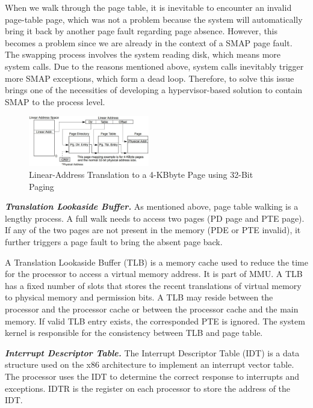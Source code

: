 
When we walk through the page table, it is inevitable to encounter an invalid page-table page, which was not a problem because the system will automatically bring it back by another page fault regarding page absence. However, this becomes a problem since we are already in the context of a SMAP page fault. The swapping process involves the system reading disk, which means more system calls. Due to the reasons mentioned above, system calls inevitably trigger more SMAP exceptions, which form a dead loop. Therefore, to solve this issue brings one of the necessities of developing a hypervisor-based solution to contain SMAP to the process level. 



\begin{figure}[th]
  \includegraphics[width=0.47\textwidth]{figures/pagetable}
  \centering
  \caption{Linear-Address Translation to a 4-KBbyte Page using 32-Bit Paging~\cite{guide2011intel}}
  \label{fig:pagetable}
\end{figure}

\textbf{\textit{Translation Lookaside Buffer.}} As mentioned above, page table walking is a lengthy process. A full walk needs to access two pages (PD page and PTE page). If any of the two pages are not present in the memory (PDE or PTE invalid), it further triggers a page fault to bring the absent page back.

A Translation Lookaside Buffer (TLB) is a memory cache used to reduce the time for the processor to access a virtual memory address. It is part of MMU. A TLB has a fixed number of slots that stores the recent translations of virtual memory to physical memory and permission bits.  A TLB may reside between the processor and the processor cache or between the processor cache and the main memory. If valid TLB entry exists, the corresponded PTE is ignored. The system kernel is responsible for the consistency between TLB and page table.



\textbf{\textit{Interrupt Descriptor Table.}} The Interrupt Descriptor Table (IDT) is a data structure used on the x86 architecture to implement an interrupt vector table. The processor uses the IDT to determine the correct response to interrupts and exceptions. IDTR is the register on each processor to store the address of the IDT.


